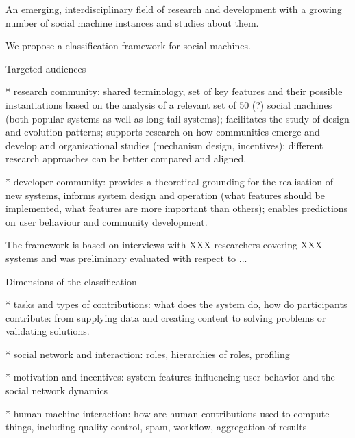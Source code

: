 \documentclass{sig-alternate}
\begin{document}
An emerging, interdisciplinary field of research and development with a growing number of social machine instances and studies about them.

We propose a classification framework for social machines. 

Targeted audiences

* research community: shared terminology, set of key features and their possible instantiations based on the analysis of a relevant set of 50 (?) social machines (both popular systems as well as long tail systems); facilitates the study of design and evolution patterns; supports research on how communities emerge and develop and organisational studies (mechanism design, incentives); different research approaches can be better compared and aligned.

* developer community: provides a theoretical grounding for the realisation of new systems, informs system design and operation (what features should be implemented, what features are more important than others); enables predictions on user behaviour and community development.

The framework is based on interviews with XXX researchers covering XXX systems and was preliminary evaluated with respect to ...

Dimensions of the classification

* tasks and types of contributions: what does the system do, how do participants contribute: from supplying data and creating content to solving problems or validating solutions.

* social network and interaction: roles, hierarchies of roles, profiling

* motivation and incentives: system features influencing user behavior and the social network dynamics

* human-machine interaction: how are human contributions used to compute things, including quality control, spam, workflow, aggregation of results
\end{document}
